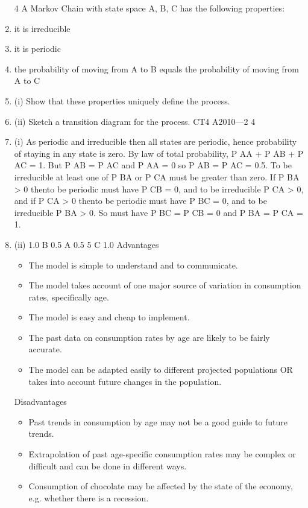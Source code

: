 \documentclass[a4paper,12pt]{article}
\begin{document}
\begin{enumerate}

4
A Markov Chain with state space {A, B, C} has the following properties:
\item it is irreducible
\item it is periodic
\item the probability of moving from A to B equals the probability of moving from A
to C
\item (i) Show that these properties uniquely define the process.
\item (ii) Sketch a transition diagram for the process.
CT4 A2010—2
4
\item (i)
As periodic and irreducible then all states are periodic, hence
probability of staying in any state is zero.
By law of total probability, P AA + P AB + P AC = 1.
But P AB = P AC and P AA = 0 so P AB = P AC = 0.5.
To be irreducible at least one of P BA or P CA must be greater than zero.
If P BA > 0 thento be periodic must have P CB = 0,
and to be irreducible P CA > 0,
and if P CA > 0 thento be periodic must have P BC = 0, and to be
irreducible P BA > 0.
So must have P BC = P CB = 0 and P BA = P CA = 1.
\item (ii)
1.0
B
0.5
A
0.5
5
C
1.0
Advantages
\begin{itemize}
\item The model is simple to understand and to communicate.
\item The model takes account of one major source of variation in consumption
rates, specifically age.
\item The model is easy and cheap to implement.
\item The past data on consumption rates by age are likely to be fairly accurate.
\item The model can be adapted easily to different projected populations OR takes
into account future changes in the population.
\end{itemize}
Disadvantages
\begin{itemize}
\item Past trends in consumption by age may not be a good guide to future trends.
\item Extrapolation of past age-specific consumption rates may be complex or
difficult and can be done in different ways.
\item Consumption of chocolate may be affected by the state of the economy,
e.g. whether there is a recession.

\end{itemize}
\end{enumerate}
\end{document}
